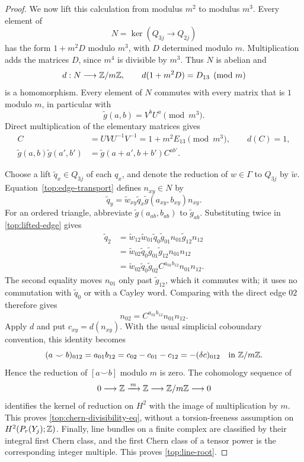 \begin{proof}
We now lift this calculation from modulus $m^2$ to modulus $m^3$.
Every element of
\[
 N=\ker(Q_{3j}\longrightarrow Q_{2j})
\]
has the form $1+m^2D$ modulo $m^3$, with $D$ determined modulo $m$.
Multiplication adds the matrices $D$, since $m^4$ is divisible by
$m^3$. Thus $N$ is abelian and
\[
 d:N\longrightarrow\mathbb Z/m\mathbb Z,
 \qquad d(1+m^2D)=D_{13}\pmod m
\]
is a homomorphism. Every element of $N$ commutes with every matrix
that is $1$ modulo $m$, in particular with
\[
 \widetilde g(a,b)=V^bU^a\pmod{m^3}.
\]
Direct multiplication of the elementary matrices gives
\begin{equation}
 \begin{split}
 C&=UVU^{-1}V^{-1}=1+m^2E_{13}\pmod{m^3},
       \qquad d(C)=1,\\
 \widetilde g(a,b)\widetilde g(a',b')
   &=\widetilde g(a+a',b+b')C^{ab'}.
 \end{split}
 \label{top:central-extension}
\end{equation}

Choose a lift $\widetilde q_x\in Q_{3j}$ of each $q_x$, and denote the
reduction of $w\in\Gamma$ to $Q_{3j}$ by $\widetilde w$.
Equation~\eqref{top:edge-transport} defines $n_{xy}\in N$ by
\begin{equation}
 \widetilde q_y=
 \widetilde w_{xy}\widetilde q_x
 \widetilde g(a_{xy},b_{xy})n_{xy}.
 \label{top:lifted-edge}
\end{equation}
For an ordered triangle, abbreviate
$\widetilde g(a_{ab},b_{ab})$ to $\widetilde g_{ab}$. Substituting
twice in \eqref{top:lifted-edge} gives
\begin{align*}
 \widetilde q_2
 &=\widetilde w_{12}\widetilde w_{01}\widetilde q_0
       \widetilde g_{01}n_{01}\widetilde g_{12}n_{12}\\
 &=\widetilde w_{02}\widetilde q_0
       \widetilde g_{01}\widetilde g_{12}n_{01}n_{12}\\
 &=\widetilde w_{02}\widetilde q_0\widetilde g_{02}
       C^{a_{01}b_{12}}n_{01}n_{12}.
\end{align*}
The second equality moves $n_{01}$ only past $\widetilde g_{12}$,
which it commutes with; it uses no commutation with
$\widetilde q_0$ or with a Cayley word. Comparing with the direct edge
$02$ therefore gives
\[
 n_{02}=C^{a_{01}b_{12}}n_{01}n_{12}.
\]
Apply $d$ and put $c_{xy}=d(n_{xy})$. With the usual simplicial
coboundary convention, this identity becomes
\[
 (a\smile b)_{012}=a_{01}b_{12}
   =c_{02}-c_{01}-c_{12}=-(\delta c)_{012}
   \quad\text{in }\mathbb Z/m\mathbb Z.
\]
Hence the reduction of $[a\smile b]$ modulo $m$ is zero. The
cohomology sequence of
\[
 0\longrightarrow\mathbb Z\xrightarrow{\,m\,}\mathbb Z
   \longrightarrow\mathbb Z/m\mathbb Z\longrightarrow0
\]
identifies the kernel of reduction on $H^2$ with the image of
multiplication by $m$. This proves
\eqref{top:chern-divisibility-eq}, without a torsion-freeness
assumption on $H^2(P_r(Y_j);\mathbb Z)$. Finally, line bundles on a finite
complex are classified by their integral first Chern class, and the
first Chern class of a tensor power is the corresponding integer
multiple. This proves \eqref{top:line-root}.
\end{proof}

